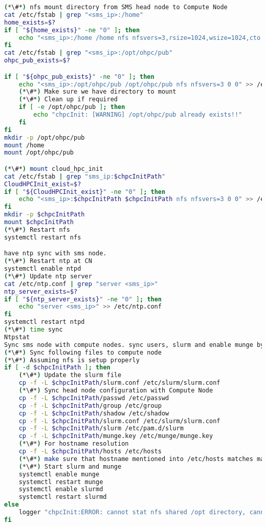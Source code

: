\begin{lstlisting}[language=bash,keywords={}]
(*\#*) nfs mount directory from SMS head node to Compute Node
cat /etc/fstab | grep "<sms_ip>:/home"
home_exists=$?
if [ "${home_exists}" -ne "0" ]; then
    echo "<sms_ip>:/home /home nfs nfsvers=3,rsize=1024,wsize=1024,cto 0 0" >> /etc/fstab
fi
cat /etc/fstab | grep "<sms_ip>:/opt/ohpc/pub"
ohpc_pub_exists=$?

if [ "${ohpc_pub_exists}" -ne "0" ]; then
    echo "<sms_ip>:/opt/ohpc/pub /opt/ohpc/pub nfs nfsvers=3 0 0" >> /etc/fstab
    (*\#*) Make sure we have directory to mount
    (*\#*) Clean up if required
    if [ -e /opt/ohpc/pub ]; then
        echo "chpcInit: [WARNING] /opt/ohpc/pub already exists!!"
    fi
fi
mkdir -p /opt/ohpc/pub
mount /home
mount /opt/ohpc/pub

(*\#*) mount cloud_hpc_init
cat /etc/fstab | grep "sms_ip:$chpcInitPath"
CloudHPCInit_exist=$?
if [ "${CloudHPCInit_exist}" -ne "0" ]; then
    echo "<sms_ip>:$chpcInitPath $chpcInitPath nfs nfsvers=3 0 0" >> /etc/fstab
fi
mkdir -p $chpcInitPath
mount $chpcInitPath
(*\#*) Restart nfs
systemctl restart nfs

have ntp sync with sms node. 
(*\#*) Restart ntp at CN
systemctl enable ntpd
(*\#*) Update ntp server
cat /etc/ntp.conf | grep "server <sms_ip>"
ntp_server_exists=$?
if [ "${ntp_server_exists}" -ne "0" ]; then
    echo "server <sms_ip>" >> /etc/ntp.conf
fi
systemctl restart ntpd
(*\#*) time sync
Ntpstat
Sync sms node with compute nodes. sync users, slurm and enable munge by copying munge keys
(*\#*) Sync following files to compute node
(*\#*) Assuming nfs is setup properly
if [ -d $chpcInitPath ]; then
    (*\#*) Update the slurm file
    cp -f -L $chpcInitPath/slurm.conf /etc/slurm/slurm.conf
    (*\#*) Sync head node configuration with Compute Node
    cp -f -L $chpcInitPath/passwd /etc/passwd
    cp -f -L $chpcInitPath/group /etc/group
    cp -f -L $chpcInitPath/shadow /etc/shadow
    cp -f -L $chpcInitPath/slurm.conf /etc/slurm/slurm.conf
    cp -f -L $chpcInitPath/slurm /etc/pam.d/slurm
    cp -f -L $chpcInitPath/munge.key /etc/munge/munge.key
    (*\#*) For hostname resolution
    cp -f -L $chpcInitPath/hosts /etc/hosts
    (*\#*) make sure that hostname mentioned into /etc/hosts matches machine hostname. TBD
    (*\#*) Start slurm and munge 
    systemctl enable munge
    systemctl restart munge
    systemctl enable slurmd
    systemctl restart slurmd
else
    logger "chpcInit:ERROR: cannot stat nfs shared /opt directory, cannot copy HPC system files"
fi
\end{lstlisting}

